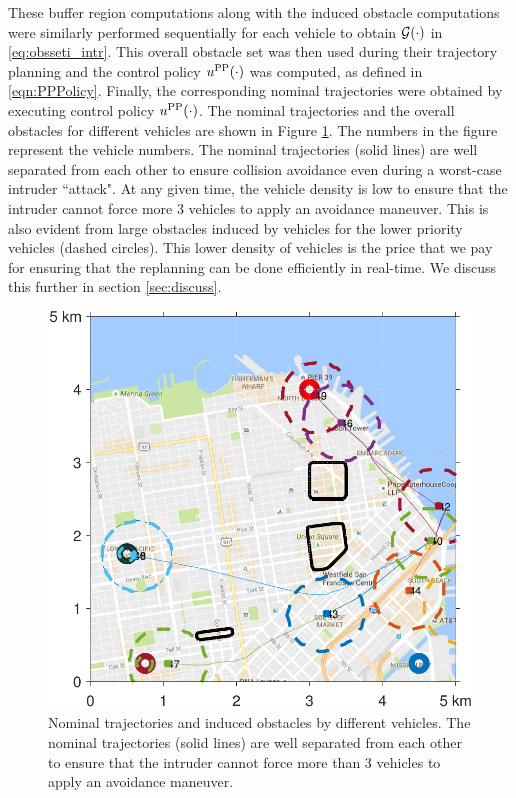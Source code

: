 These buffer region computations along with the induced obstacle computations were similarly performed sequentially for each vehicle to obtain $\mathcal{G}(\cdot)$ in \eqref{eq:obsseti_intr}. This overall obstacle set was then used during their trajectory planning and the control policy $u^{\text{PP}}(\cdot)$ was computed, as defined in \eqref{eqn:PPPolicy}. Finally, the corresponding nominal trajectories were obtained by executing control policy $u^{\text{PP}}(\cdot)$. %
The nominal trajectories and the overall obstacles for different vehicles are shown in Figure \ref{fig:trajObsSim}. The numbers in the figure represent the vehicle numbers. The nominal trajectories (solid lines) are well separated from each other to ensure collision avoidance even during a worst-case intruder ``attack". At any given time, the vehicle density is low to ensure that the intruder cannot force more 3 vehicles to apply an avoidance maneuver. This is also evident from large obstacles induced by vehicles for the lower priority vehicles (dashed circles). This lower density of vehicles is the price that we pay for ensuring that the replanning can be done efficiently in real-time. We discuss this further in section \ref{sec:discuss}.
\begin{figure}
  \centering
  \includegraphics[width=0.8\columnwidth]{figs/nomTraj}
  \caption{Nominal trajectories and induced obstacles by different vehicles. The nominal trajectories (solid lines) are well separated from each other to ensure that the intruder cannot force more than 3 vehicles to apply an avoidance maneuver.}
  \label{fig:trajObsSim}
\end{figure}

